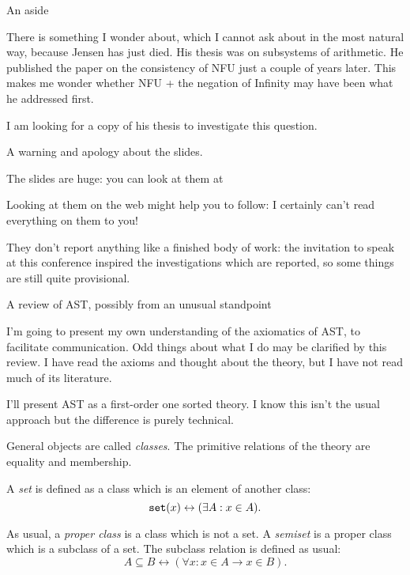 \documentclass{slides}
\begin{document}
\begin{slide}
{\Large An aside}

There is something I wonder about, which I cannot ask about in the most natural way, because Jensen has just died.
His thesis was on subsystems of arithmetic.  He published the paper on the consistency of NFU just a couple of years later.  This makes me wonder whether NFU + the negation of Infinity may have been what he addressed first.

I am looking for a copy of his thesis to investigate this question.

\end{slide}

\begin{slide}

A warning and apology about the slides.

The slides are huge:  you can look at them at {\small{}}

Looking at them on the web might help you to follow:  I certainly can't read everything on them to you!

They don't report anything like a finished body of work:  the invitation to speak at this conference inspired the investigations which are reported, so some things are still quite provisional.

\end{slide}

\begin{slide}

{\Large A review of AST, possibly from an unusual standpoint}

I'm going to present my own understanding of the axiomatics of AST, to facilitate communication.  Odd things about what I do may be clarified by this review.  I have read the axioms and thought about the theory, but I have not read much of its literature.


\end{slide}

\begin{slide}

I'll present AST as a first-order one sorted theory.  I know this isn't the usual approach but the difference is purely technical.

General objects are called {\em classes\/}.  The primitive relations of the theory are equality and membership.

A {\em set\/} is defined as a class which is an element of another class:  $${\tt set}(x) \leftrightarrow (\exists A:x \in A).$$

As usual, a {\em proper class\/} is a class which is not a set.  A {\em semiset\/} is a proper class which is a subclass of a set.  The subclass relation is defined as usual:  $$A \subseteq B \leftrightarrow (\forall x:x \in A \rightarrow x \in B).$$

\end{slide}
\end{document}
